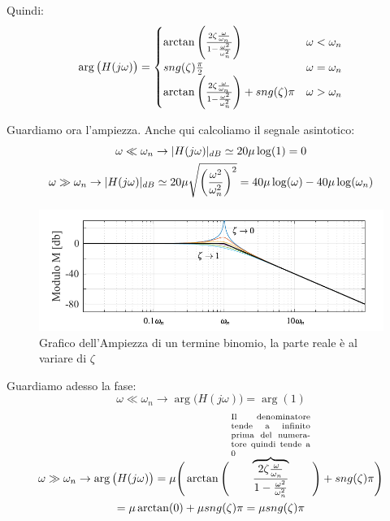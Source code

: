 Quindi:
\[ 
 	\arg\big(H(j\omega)\big) = 
 	\begin{cases}
	 	\arctan\Bigg(\frac{2\zeta\frac{\omega}{\omega_n}}{1-\frac{\omega^2}{\omega^{2}_{n}}}\Bigg) & \omega < \omega_n\\
	 	sng(\zeta)\frac{\pi}{2} &	\omega = \omega_n\\
	 	\arctan\Bigg(\frac{2\zeta\frac{\omega}{\omega_n}}{1-\frac{\omega^2}{\omega^{2}_{n}}}\Bigg)+ sng(\zeta)\pi & \omega > \omega_n\\
 	\end{cases}
\]
  
Guardiamo ora l'ampiezza. Anche qui calcoliamo il segnale asintotico:
\begin{gather*}
  	\omega \ll \omega_n \rightarrow \lvert H(j\omega)\rvert_{dB}\simeq 20\mu \log(1) = 0\\
  	\omega \gg \omega_n \rightarrow \lvert H(j\omega)\rvert_{dB}\simeq 20\mu \sqrt{	\bigg(\frac{\omega^2}{\omega^2_n}\bigg)^2} = 40\mu \log(\omega)-40 \mu \log(\omega_n)
\end{gather*}

\begin{figure}[H]
	\centering
	\includegraphics[width=0.7\linewidth]{immagini/cap6_Bode/bodeBin-Amp}
	\caption{Grafico dell'Ampiezza di un termine binomio, la parte reale è al variare di $ \zeta $}
	\label{fig:bodeBin-Amp}
\end{figure}

Guardiamo adesso la fase:
\begin{equation*}
	\omega \ll \omega_n \rightarrow \arg \big(H(j\omega)\big) = \arg(1)
\end{equation*}
\begin{multline*}
	\omega \gg \omega_n \rightarrow \arg \big(H(j\omega)\big) = \mu \Bigg(\arctan\Bigg(\overbrace{\frac{2\zeta\frac{\omega}{\omega_n}}{1-\frac{\omega^2}{\omega^{2}_{n}}}}^{\parbox{7
			em}{\scriptsize Il denominatore tende a infinito prima del numeratore quindi tende a 0}}\Bigg)+ \sng(\zeta)\pi\Bigg) \\= \mu \arctan(0) + \mu \sng(\zeta)\pi = \mu \sng(\zeta)\pi
\end{multline*}


